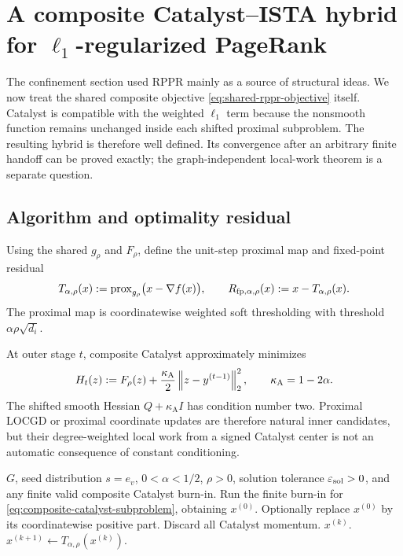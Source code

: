 \section{A composite Catalyst--ISTA hybrid for
\texorpdfstring{$\ell_1$}{l1}-regularized PageRank}
\label{sec:composite-rppr-hybrid}

The confinement section used RPPR mainly as a source of structural ideas.  We
now treat the shared composite objective \cref{eq:shared-rppr-objective}
itself.  Catalyst
is compatible with the weighted $\ell_1$ term because the nonsmooth function
remains unchanged inside each shifted proximal subproblem.  The resulting
hybrid is therefore well defined.  Its convergence after an arbitrary finite
handoff can be proved exactly; the graph-independent local-work theorem is a
separate question.

\subsection{Algorithm and optimality residual}

Using the shared \(g_\rho\) and \(F_\rho\), define the unit-step proximal map
and fixed-point residual
\begin{equation}
  T_{\alpha,\rho}(x)
  :=\operatorname{prox}_{g_\rho}\bigl(x-\nabla f(x)\bigr),
  \qquad
  R_{\mathrm{fp},\alpha,\rho}(x):=x-T_{\alpha,\rho}(x).
  \label{eq:rppr-prox-residual}
\end{equation}
The proximal map is coordinatewise weighted soft thresholding with threshold
$\alpha\rho\sqrt{d_i}$.

At outer stage $t$, composite Catalyst approximately minimizes
\begin{equation}
  H_t(z)
  :=F_\rho(z)+\frac{\kappa_{\mathrm A}}{2}\left\lVert z-y^{(t-1)}\right\rVert_2^2,
  \qquad \kappa_{\mathrm A}=1-2\alpha.
  \label{eq:composite-catalyst-subproblem}
\end{equation}
The shifted smooth Hessian $Q+\kappa_{\mathrm A} I$ has condition number two.
Proximal LOCGD or proximal coordinate updates are therefore natural inner candidates,
but their degree-weighted local work from a signed Catalyst center is not an
automatic consequence of constant conditioning.

\begin{algorithm}[t]
\caption{Proof-oriented composite Catalyst--ISTA hybrid}
\label{alg:composite-rppr-hybrid}
\begin{algorithmic}[1]
\REQUIRE $G$, seed distribution $s=e_v$, $0<\alpha<1/2$, $\rho>0$,
         solution tolerance
         $\varepsilon_{\mathrm{sol}}>0$, and any finite valid composite Catalyst burn-in.
\STATE Run the finite burn-in for \cref{eq:composite-catalyst-subproblem},
       obtaining $x^{(0)}$.
\STATE Optionally replace $x^{(0)}$ by its coordinatewise positive part.
\STATE Discard all Catalyst momentum.
    \RETURN $x^{(k)}$.
  \ENDIF
  \STATE $x^{(k+1)}\leftarrow T_{\alpha,\rho}(x^{(k)})$.
\ENDFOR
\end{algorithmic}
\end{algorithm}

